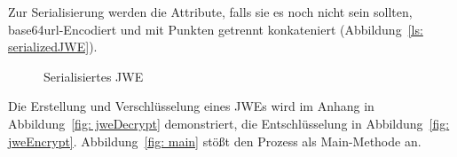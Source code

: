 Zur Serialisierung werden die Attribute, falls sie es noch nicht sein sollten,
base64url-Encodiert und mit Punkten getrennt konkateniert (Abbildung~\ref{ls:
serializedJWE}).
\begin{figure}[h]
    \scalebox{.8}{
        
    }
    \caption{Serialisiertes JWE}\label{ls: serializedJWE}
\end{figure}
Die Erstellung und Verschlüsselung eines JWEs wird im Anhang in
Abbildung~\ref{fig: jweDecrypt} demonstriert, die Entschlüsselung in
Abbildung~\ref{fig: jweEncrypt}. Abbildung~\ref{fig: main} stößt den Prozess als
Main-Methode an.
